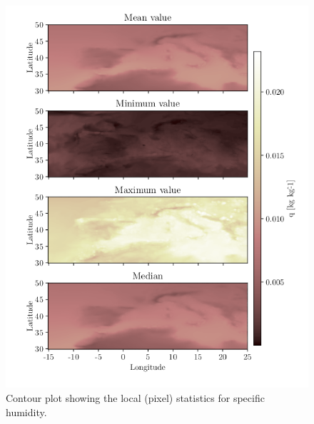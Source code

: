\begin{figure}[ht]
    \centering
    \includegraphics{python_figs/all_stat_variable_q.png}
    \caption{Contour plot showing the local (pixel) statistics for specific humidity.}
    \label{fig:all_stats_q}
\end{figure}
\cleardoublepage
